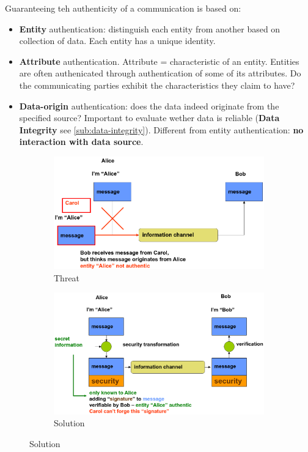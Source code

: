 \documentclass[11pt,british,faculty=ea,layout=titlefont,underline=false,titleUppercase=true,titleUnderline=true,hidelinks]{ugent2016-report}
\begin{document}
			Guaranteeing teh authenticity of a communication is based on:
			\begin{itemize}
				\item \textbf{Entity} authentication: distinguish each entity from another based on collection of data. Each entity has a unique identity.
				\item \textbf{Attribute} authentication. Attribute = characteristic of an entity. Entities are often authenicated through authentication of some of its attributes. Do the communicating parties exhibit the characteristics they claim to have?
				\item \textbf{Data-origin} authentication: does the data indeed originate from the specified source? Important to evaluate wether data is reliable (\textbf{Data Integrity} see \ref{sub:data-integrity}). Different from entity authentication: \textbf{no interaction with data source}.
			\end{itemize}
			\begin{figure}[h]
				\centering
				\begin{subfigure}{.40\textwidth}
					\centering
					\includegraphics[width=\linewidth]{images/authentication-threat.png}
					\caption{Threat}
					\label{fig:authentication-threat}
				\end{subfigure}
				\begin{subfigure}{.50\textwidth}
					\centering
					\includegraphics[width=\linewidth]{images/authentication-threat-solution.png}
					\caption{Solution}
					\label{fig:authentication-threat-solution}
				\end{subfigure}
			\end{figure}
\end{document}
